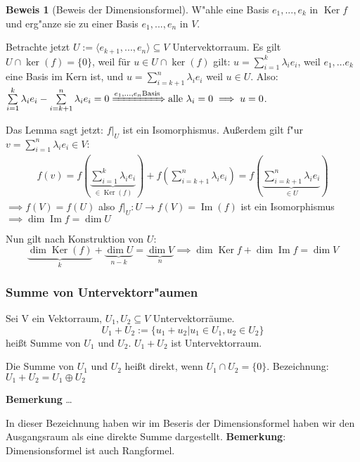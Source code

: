 \documentclass[11pt]{article}
\DeclareMathOperator{\mdim}{dim}
\DeclareMathOperator{\mKer}{Ker}
\DeclareMathOperator{\mIm}{Im}
\theoremstyle{remark}
\theoremstyle{definition}
\newtheorem{prof}{Beweis}
\theoremstyle{remark}
\begin{document}
\begin{prof}[Beweis der Dimensionsformel] \label{}
W"ahle eine Basis \({e_1, ..., e_k}\) in \(\mKer f\) und erg"anze sie zu einer Basis
\({e_1, ..., e_n}\) in \(V\).

Betrachte jetzt \(U:=\langle e_{k+1}, ..., e_n\rangle \subseteq V\) Untervektorraum. Es gilt $U \cap \ker(f) = \{0\}$, weil für $u\in U \cap \ker(f)$ gilt: \(u = \sum\limits_{i=1}^k \lambda_ie_i \), weil \(e_1, \dots e_k\) eine Basis im Kern ist, und \(u = \sum\limits_{i=k+1}^{n} \lambda_i e_i\) weil \(u\in U\). Also: \(\sum\limits_{i=1}^k \lambda_ie_i - \sum\limits_{i=k+1}^{n} \lambda_ie_i = 0 \xRightarrow{e_1,\dots, e_n \text{Basis}} \text{alle }\lambda_i = 0 \implies u =0\).

Das Lemma sagt jetzt: \(f|_U\) ist ein Isomorphismus. Außerdem gilt f"ur \(v =\sum\limits_{i=1}^{n}\lambda_ie_i \in V:\)
\begin{align*}
f(v) = f\left(\underbrace{\sum_{i=1}^{k}\lambda_ie_i}_{\in \mKer(f)}\right) + f\left(\sum_{i=k+1}^{n}\lambda_ie_i\right) = f\left(\underbrace{\sum_{i=k+1}^{n} \lambda_ie_i}_{\in U}\right)
\end{align*}
\(\implies f(V)=f(U)\) also \(f|_U : U\to f(V) = \mIm(f) \) ist ein Isomorphismus \(\implies \mdim \mIm f = \mdim U \)

Nun gilt nach Konstruktion von \(U\): \[\underbrace{\mdim \mKer(f)}_{k} + \underbrace{\mdim U}_{n-k} = \underbrace{\mdim V}_{n} \implies \mdim\mKer f + \mdim\mIm f = \mdim V \]
\end{prof}

\subsubsection{Summe von Untervektorr"aumen}
\label{sec:org83dfe63}
\begin{definition}{}{}
	Sei V ein Vektorraum, $U_1, U_2 \subseteq V$ Untervektorräume.
	\[U_1 + U_2 := \{u_1+u_2 | u_1 \in U_1, u_2 \in U_2\}\]
	heißt Summe von $U_1$ und $U_2$.
	$U_1 + U_2$ ist Untervektorraum.
	
\end{definition}
\begin{definition}{}{}
Die Summe von $U_1$ und $U_2$ heißt direkt, wenn $U_1 \cap U_2 = \{0\}$. Bezeichnung: $U_1 + U_2 = U_1 \oplus U_2$
\end{definition}

\textbf{Bemerkung} \ldots{}

In dieser Bezeichnung haben wir im Beseris der Dimensionsformel haben wir den
Ausgangsraum als eine direkte Summe dargestellt. 
\textbf{Bemerkung}: Dimensionsformel ist auch Rangformel.
\end{document}
